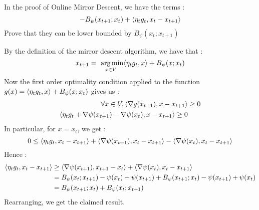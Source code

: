 \begin{exercise}[]{}
	In the proof of Online Mirror Descent, we have the terms :
\begin{equation*}
	-B_{\psi}(x_{t+1} ; x_t) + \langle\eta_tg_t,x_t -x_{t+1}\rangle
\end{equation*}
Prove that they can be lower bounded by $ B_{\psi}(x_t ; x_{t+1}) $
\end{exercise}

\begin{solution}[]
	By the definition of the mirror descent algorithm, we have that :
\begin{equation*}
	x_{t+1} = \mathop{\mbox{ arg\,min}}_{x\in V}\langle\eta_tg_t,x\rangle + B_{\psi} (x ; x_t)
\end{equation*}
Now the first order optimality condition applied to the function $ g(x) = \langle\eta_tg_t,x\rangle + B_{\psi}(x ; x_t) $ gives us :
\begin{align*}
	\forall x \in V, \langle\nabla g(x_{t+1}),x-x_{t+1}\rangle &\geq 0 \\
	\langle\eta_tg_t + \nabla \psi(x_{t+1}) -\nabla \psi(x_t),x-x_{t+1}\rangle \geq  0
\end{align*}
In particular, for $ x=x_t $, we get :
\begin{equation*}
	0\leq \langle\eta_tg_t,x_t - x_{t+1}\rangle + \langle\nabla \psi(x_{t+1}),x_t-x_{t+1}\rangle - \langle\nabla \psi(x_t),x_t-x_{t+1}\rangle \\
\end{equation*}
Hence :
\begin{align*}
	\langle\eta_tg_t,x_t - x_{t+1}\rangle &\geq \langle\nabla \psi(x_{t+1}),x_{t+1}-x_t\rangle + \langle\nabla \psi(x_t),x_t -x_{t+1}\rangle \\
	&= B_{\psi}(x_t ; x_{t+1}) - \psi(x_t) + \psi(x_{t+1}) + B_{\psi}(x_{t+1} ;x_t) - \psi(x_{t+1}) + \psi(x_t) \\
	&= B_{\psi}(x_{t+1} ; x_t) + B_{\psi}(x_t ; x_{t+1})
\end{align*}
Rearranging, we get the claimed result.
\end{solution}
